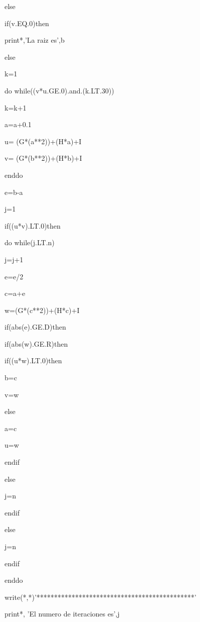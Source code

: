          else

          if(v.EQ.0)then

           print*,'La raiz es',b

          else

            k=1

            do while((v*u.GE.0).and.(k.LT.30))

             k=k+1

             a=a+0.1

             u= (G*(a**2))+(H*a)+I

             v= (G*(b**2))+(H*b)+I

            enddo

            e=b-a

            j=1

            if((u*v).LT.0)then

               do while(j.LT.n)

                 j=j+1

                 e=e/2

                 c=a+e

                 w=(G*(c**2))+(H*c)+I



                 if(abs(e).GE.D)then

                   if(abs(w).GE.R)then

                     if((u*w).LT.0)then

                      b=c

                      v=w

                     else

                      a=c

                      u=w

                     endif

                   else

                     j=n

                   endif

                 else

                 j=n

                 endif

               enddo

               write(*,*)'*********************************************'

               print*, 'El numero de iteraciones es',j

